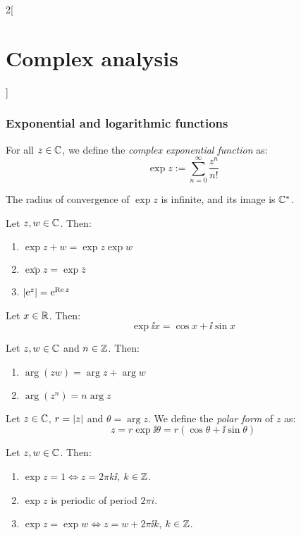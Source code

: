 \documentclass[../../../main_math.tex]{subfiles}
\begin{document}
\begin{multicols}{2}[\section{Complex analysis}]
  \subsubsection{Exponential and logarithmic functions}
  \begin{definition}
    For all $z \in \mathbb{C}$, we define the \emph{complex exponential function} as: $$\exp{z}:=\sum_{n=0}^\infty\frac{z^n}{n!}$$
  \end{definition}
  \begin{proposition}
    The radius of convergence of $\exp{z}$ is infinite, and its image is $\mathbb{C}^*$.
  \end{proposition}
  \begin{proposition}
    Let $z,w\in\mathbb{C}$. Then:
    \begin{enumerate}
      \item $\exp{z+w}=\exp{z}\exp{w}$
      \item $\overline{\exp{z}}=\exp{\overline{z}}$
      \item $\abs{\mathrm{e}^{z}}=\mathrm{e}^{\Re z}$
    \end{enumerate}
  \end{proposition}
  \begin{corollary}
    Let $x\in\mathbb{R}$. Then: $$\exp{\ii x}=\cos x+\ii \sin x$$
  \end{corollary}
  \begin{proposition}
    Let $z, w \in \mathbb{C}$ and $n\in\mathbb{Z}$. Then:
    \begin{enumerate}
      \item $\arg(zw) = \arg z + \arg w$
      \item $\arg(z^n) = n \arg{z}$
    \end{enumerate}
  \end{proposition}
  \begin{definition}
    Let $z\in\mathbb{C}$, $r=\abs{z}$ and $\theta=\arg z$. We define the \emph{polar form} of $z$ as: $$z = r\exp{\ii\theta}=r(\cos{\theta} + \ii\sin{\theta})$$
  \end{definition}
  \begin{corollary}
    Let $z,w\in\mathbb{C}$. Then:
    \begin{enumerate}
      \item $\exp{z}=1\iff z=2\pi k\ii$, $k\in\mathbb{Z}$.
      \item $\exp{z}$ is periodic of period $2\pi i$.
      \item $\exp{z}=\exp{w}\iff z=w+2\pi \ii k$, $k\in\mathbb{Z}$.
    \end{enumerate}

\end{corollary}
\end{multicols}
\end{document}
